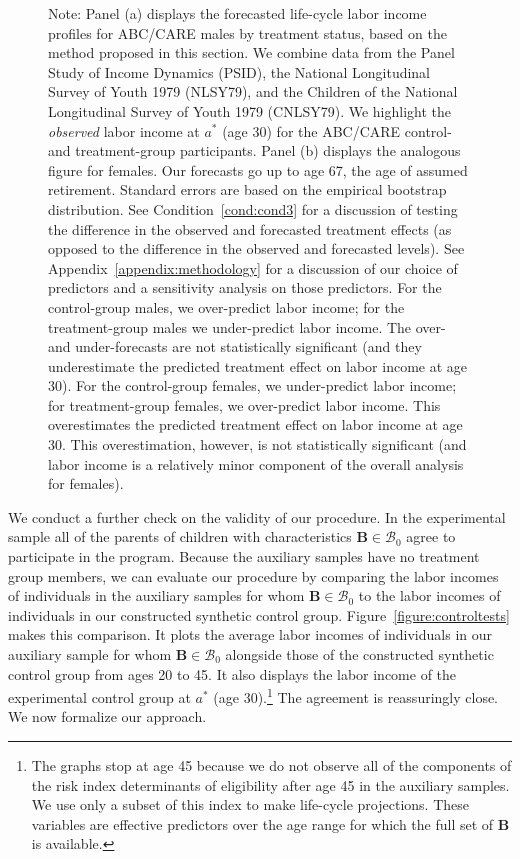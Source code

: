 \begin{figure}
Note: Panel (a) displays the forecasted life-cycle labor income profiles for ABC/CARE males by treatment status, based on the method proposed in this section. We combine data from the Panel Study of Income Dynamics (PSID), the National Longitudinal Survey of Youth 1979 (NLSY79), and the Children of the National Longitudinal Survey of Youth 1979 (CNLSY79). We highlight the \textit{observed} labor income at $a^*$ (age 30) for the ABC/CARE control- and treatment-group participants. Panel (b) displays the analogous figure for females. Our forecasts go up to age 67, the age of assumed retirement. Standard errors are based on the empirical bootstrap distribution. See Condition~\ref{cond:cond3} for a discussion of testing the difference in the observed and forecasted treatment effects (as opposed to the difference in the observed and forecasted levels). See  Appendix~\ref{appendix:methodology} for a discussion of our choice of predictors and a sensitivity analysis on those predictors. For the control-group males, we over-predict labor income; for the treatment-group males we under-predict labor income. The over- and under-forecasts are not statistically significant (and they underestimate the predicted treatment effect on labor income at age 30). For the control-group females, we under-predict labor income; for treatment-group females, we over-predict labor income. This overestimates the predicted treatment effect on labor income at age 30. This overestimation, however, is not statistically significant (and labor income is a relatively minor component of the overall analysis for females).
\end{figure}

We conduct a further check on the validity of our procedure. In the experimental sample all of the parents of children with characteristics $\bm{B} \in \mathcal{B}_0$ agree to participate in the program.  Because the auxiliary samples have no treatment group members, we can evaluate our procedure by comparing the labor incomes of individuals in the auxiliary samples for whom $\bm{B} \in \mathcal{B}_0$ to the labor incomes of individuals in our constructed synthetic control group. Figure~\ref{figure:controltests} makes this comparison. It plots the average labor incomes of individuals in our auxiliary sample for whom $\bm{B} \in \mathcal{B}_0$ alongside those of the constructed synthetic control group from ages 20 to 45. It also displays the labor income of the experimental control group at $a^*$ (age 30).\footnote{The graphs stop at age 45 because we do not observe all of the components of the risk index determinants of eligibility after age 45 in the auxiliary samples. We use only a subset of this index to make life-cycle projections. These variables are effective predictors over the age range for which the full set of $\bm{B}$ is available.} The agreement is reassuringly close. We now formalize our approach.

